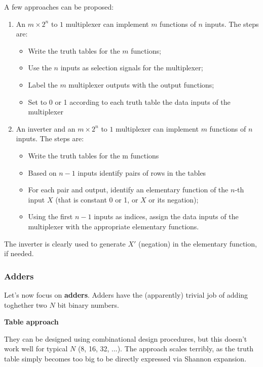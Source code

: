 \documentclass[a4paper,11pt]{article}
\begin{document}
A few approaches can be proposed:
\begin{enumerate}
	\item An $m \times 2^n$ to $1$ multiplexer can implement $m$ functions of $n$ inputs. The steps are:
	      \begin{itemize}
		      \item Write the truth tables for the $m$ functions;
		      \item Use the $n$ inputs as selection signals for the multiplexer;
		      \item Label the $m$ multiplexer outputs with the output functions;
		      \item Set to 0 or 1 according to each truth table the data inputs of the multiplexer
	      \end{itemize}
	\item An inverter and an $m \times 2^n$ to $1$ multiplexer can implement $m$ functions of $n$ inputs. The steps are:
	      \begin{itemize}
		      \item Write the truth tables for the m functions
		      \item Based on $n-1$ inputs identify pairs of rows in the tables
		      \item For each pair and output, identify an elementary function of the $n$-th input $X$ (that is constant 0 or 1, or $X$ or its negation);
		      \item Using the first $n-1$ inputs as indices, assign the data inputs of the multiplexer with the appropriate elementary functions.
	      \end{itemize}
\end{enumerate}

The inverter is clearly used to generate $X'$ (negation) in the elementary function, if needed.

\subsubsection{Adders}

Let's now focus on \textbf{adders}.
Adders have the (apparently) trivial job of adding toghether two $N$ bit binary numbers.

\par\smallskip
\textbf{\textsf{Table approach}}

They can be designed using combinational design procedures, but this doesn’t work well for typical $N$ (8, 16, 32, ...).
The approach scales terribly, as the truth table simply becomes too big to be directly expressed via Shannon expansion.
\end{document}
